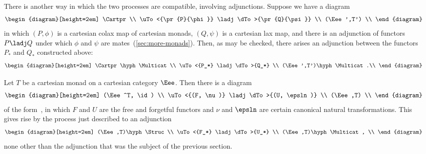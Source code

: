 There is another way in which the two processes are compatible, involving
adjunctions.  Suppose we have a diagram
%
\begin{equation}	\label{diag:adjt-change}
\begin{diagram}[height=2em]
\Cartpr			\\
\uTo<{\pr{P}{\phi}}	
\ladj			
\dTo>{\pr{Q}{\psi}}	\\
(\Eee',T')		\\
\end{diagram}
\end{equation}
%
in which $(P, \phi)$ is a cartesian colax map of cartesian monads, $(Q,
\psi)$ is a cartesian lax map, and there is an adjunction%
%
%
of functors
$P\ladj Q$ under which $\phi$ and $\psi$ are mates~(\ref{sec:more-monads}).
Then, as may be checked, there arises an adjunction between the functors
$P_*$ and $Q_*$ constructed above:
%
\begin{equation}   \label{diag:mti-adjn}
\begin{diagram}[height=2em]
\Cartpr\hyph\Multicat	\\
\uTo<{P_*}		
\ladj			
\dTo>{Q_*}		\\
(\Eee',T')\hyph\Multicat.\\
\end{diagram}
\end{equation}

\begin{example}	
Let $T$ be a cartesian monad on a cartesian category $\Eee$.  Then there is
a diagram
\[
\begin{diagram}[height=2em]
(\Eee^T, \id)		\\
\uTo<{(F, \nu)}		
\ladj			
\dTo>{(U, \epsln)}	\\
(\Eee,T)		\\
\end{diagram}
\]
of the form~, in which $F$ and $U$ are the free and
forgetful functors and $\nu$ and $\epsln$ are certain canonical natural
transformations.  This gives rise by the process just described to an
adjunction
\[
\begin{diagram}[height=2em]
(\Eee,T)\hyph\Struc	\\
\uTo<{F_*}		
\ladj			
\dTo>{U_*}		\\
(\Eee,T)\hyph\Multicat,	\\
\end{diagram}%
%
\index{structured category!generalized multicategory@\vs.\ generalized multicategory}%
%
\index{generalized multicategory!structured category@\vs.\ structured category}
%
\]
none other than the adjunction that was the subject of the previous
section.
\end{example}

